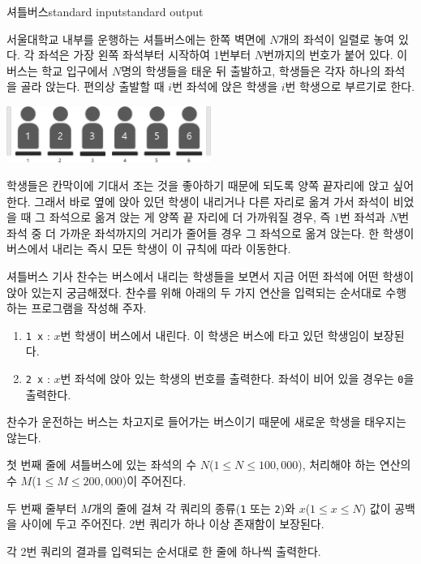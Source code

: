 \begin{problem}{셔틀버스}{standard input}{standard output}

서울대학교 내부를 운행하는 셔틀버스에는 한쪽 벽면에 $N$개의 좌석이 일렬로 놓여 있다. 각 좌석은 가장 왼쪽 좌석부터 시작하여 1번부터 $N$번까지의 번호가 붙어 있다. 이 버스는 학교 입구에서 $N$명의 학생들을 태운 뒤 출발하고, 학생들은 각자 하나의 좌석을 골라 앉는다. 편의상 출발할 때 $i$번 좌석에 앉은 학생을 $i$번 학생으로 부르기로 한다.

\begin{center}
  \includegraphics[width=0.5\textwidth]{bus1.png}
\end{center}
학생들은 칸막이에 기대서 조는 것을 좋아하기 때문에 되도록 양쪽 끝자리에 앉고 싶어 한다. 그래서 바로 옆에 앉아 있던 학생이 내리거나 다른 자리로 옮겨 가서 좌석이 비었을 때 그 좌석으로 옮겨 앉는 게 양쪽 끝 자리에 더 가까워질 경우, 즉 $1$번 좌석과 $N$번 좌석 중 더 가까운 좌석까지의 거리가 줄어들 경우 그 좌석으로 옮겨 앉는다. 한 학생이 버스에서 내리는 즉시 모든 학생이 이 규칙에 따라 이동한다.

셔틀버스 기사 찬수는 버스에서 내리는 학생들을 보면서 지금 어떤 좌석에 어떤 학생이 앉아 있는지 궁금해졌다. 찬수를 위해 아래의 두 가지 연산을 입력되는 순서대로 수행하는 프로그램을 작성해 주자.

\begin{enumerate}
\item{\texttt{1 x} : $x$번 학생이 버스에서 내린다. 이 학생은 버스에 타고 있던 학생임이 보장된다.}
\item{\texttt{2 x} : $x$번 좌석에 앉아 있는 학생의 번호를 출력한다. 좌석이 비어 있을 경우는 \texttt{0}을 출력한다.}
\end{enumerate}

찬수가 운전하는 버스는 차고지로 들어가는 버스이기 때문에 새로운 학생을 태우지는 않는다.

\InputFile
첫 번째 줄에 셔틀버스에 있는 좌석의 수 $N$($1 \le N \le 100,000$), 처리해야 하는 연산의 수 $M$($1 \le M \le 200,000$)이 주어진다.

두 번째 줄부터 $M$개의 줄에 걸쳐 각 쿼리의 종류(\texttt{1} 또는 \texttt{2})와 $x$($1 \le x \le N$) 값이 공백을 사이에 두고 주어진다. 2번 쿼리가 하나 이상 존재함이 보장된다.

\OutputFile
각 2번 쿼리의 결과를 입력되는 순서대로 한 줄에 하나씩 출력한다.


\end{problem}
